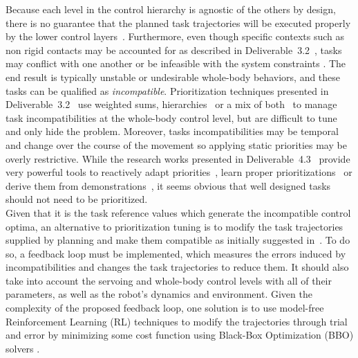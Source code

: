 \documentclass[12pt,a4paper,twoside]{article}
\begin{document}
Because each level in the control hierarchy is agnostic of the others by design, there is no guarantee that the planned task trajectories will be executed properly by the lower control layers~\underline{\bf \cite{padois-HDR2016,ibanez_humanoidhandbook2016}}. Furthermore, even though specific contexts such as non rigid contacts may be accounted for as described in Deliverable~3.2~\cite{deliverable32}, tasks may conflict with one another or be infeasible with the system constraints \cite{Bouyarmane2015, Wieber2017}. The end result is typically unstable or undesirable whole-body behaviors, and these tasks can be qualified as \textit{incompatible}. Prioritization techniques presented in Deliverable~3.2~\cite{deliverable32} use weighted sums\cite{Salini2011, Bouyarmane2011}, hierarchies~\cite{Saab2013,Escande2014, Dietrich2015} or a mix of both~\cite{liu-AutRob2015,liu-AutRobSI2015} to manage task incompatibilities at the whole-body control level, but are difficult to tune and only hide the problem. Moreover, tasks incompatibilities may be temporal and change over the course of the movement so applying static priorities may be overly restrictive. While the research works presented in Deliverable~4.3~\cite{deliverable43} provide very powerful tools to reactively adapt priorities~\cite{Lober2015}, learn proper prioritizations~\underline{\bf \cite{Modugno2016,modugno2016learning}} or derive them from demonstrations~\underline{\bf \cite{Paraschos_2017}}, it seems obvious that well designed tasks should not need to be prioritized.\\

 Given that it is the task reference values which generate the incompatible control optima, an alternative to prioritization tuning is to modify the task trajectories supplied by planning and make them compatible as initially suggested in~\underline{\bf \cite{Lober2014}}. To do so, a feedback loop must be implemented, which measures the errors induced by incompatibilities and changes the task trajectories to reduce them. It should also take into account the servoing and whole-body control levels with all of their parameters, as well as the robot's dynamics and environment. Given the complexity of the proposed feedback loop, one solution is to use model-free Reinforcement Learning (RL) techniques to modify the trajectories through trial and error by minimizing some cost function using Black-Box Optimization (BBO) solvers \cite{Kober2013}.\\
\end{document}
